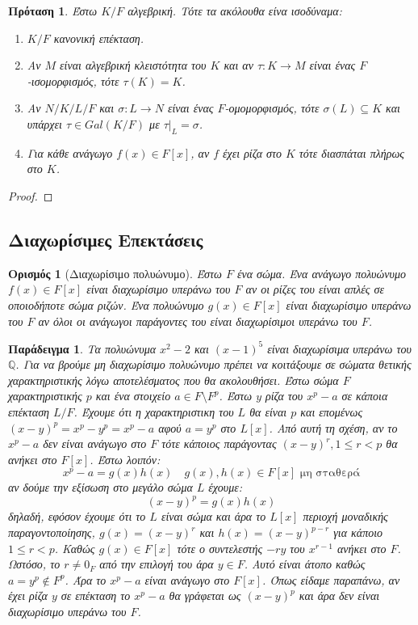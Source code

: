 \documentclass[oneside,a4paper]{article}
\newtheorem{example}{Παράδειγμα}
\newtheorem*{defn}{Ορισμός}
\newtheorem{prop}{Πρόταση}
\newcommand{\Q}{\mathbb{Q}}
\begin{document}
\begin{prop}%
	\label{3.28}
	Έστω $K/F$ αλγεβρική. Τότε τα ακόλουθα είνα ισοδύναμα:
	\begin{enumerate}
		\item $K/F$ κανονική επέκταση.
		\item Αν $M$ είναι αλγεβρική κλειστότητα του $K$ και αν $\tau : K \rightarrow M$ είναι ένας $F$-ισομορφισμός, τότε $\tau(K) = K$. %
		\item Αν $N/K/L/F$ και $\sigma : L \rightarrow N$ είναι ένας $F$-ομομορφισμός, τότε $\sigma(L) \subseteq K$ και υπάρχει $\tau \in Gal(K/F)$ με $\tau|_L = \sigma$.
		\item Για κάθε ανάγωγο $f(x) \in F[x]$, αν $f$ έχει ρίζα στο $K$ τότε διασπάται πλήρως στο $K$.
	\end{enumerate}
\end{prop}

\begin{proof}
\end{proof}

\subsection{Διαχωρίσιμες Επεκτάσεις}
\vspace{1cm}

\begin{defn}[Διαχωρίσιμο πολυώνυμο]
	Έστω $F$ ένα σώμα. Ένα ανάγωγο πολυώνυμο $f(x) \in F[x]$ είναι διαχωρίσιμο υπεράνω του $F$ αν οι ρίζες του είναι απλές σε οποιοδήποτε σώμα ριζών. Ένα πολυώνυμο $g(x) \in F[x]$ είναι διαχωρίσιμο υπεράνω του $F$ αν όλοι οι ανάγωγοι παράγοντες του είναι διαχωρίσιμοι υπεράνω του $F$.
\end{defn}
\begin{example}
	Τα πολυώνυμα $x^2 - 2$ και $(x-1)^5$ είναι διαχωρίσιμα υπεράνω του $\Q$. Για να βρούμε μη διαχωρίσιμο πολυώνυμο πρέπει να κοιτάξουμε σε σώματα θετικής χαρακτηριστικής λόγω αποτελέσματος που θα ακολουθήσει. Έστω σώμα $F$ χαρακτηριστικής $p$ και ένα στοιχείο $a \in F \setminus F^p$. Έστω $y$ ρίζα του $x^p - a$ σε κάποια επέκταση $L/F$. Έχουμε ότι η χαρακτηριστικη του $L$ θα είναι $p$ και επομένως $(x-y)^p = x^p - y^p = x^p - a$ αφού $a = y^p$ στο $L[x]$. Από αυτή τη σχέση, αν το $x^p -a$ δεν είναι ανάγωγο στο $F$ τότε κάποιος παράγοντας $(x-y)^r , 1\leq r < p$ θα ανήκει στο $F[x]$. Έστω λοιπόν:
	$$x^p - a = g(x) h(x) \quad g(x),h(x) \in F[x] \text{ μη σταθερά}$$
	αν δούμε την εξίσωση στο μεγάλο σώμα $L$ έχουμε:
	$$(x-y)^p = g(x)h(x)$$
	δηλαδή, εφόσον έχουμε ότι το $L$ είναι σώμα και άρα το $L[x]$ περιοχή μοναδικής παραγοντοποίησης, $g(x) = (x-y)^r$ και $h(x) = (x-y)^{p-r}$ για κάποιο $1\leq r < p$. Καθώς $g(x) \in F[x]$ τότε ο συντελεστής $-ry$ του $x^{r-1}$ ανήκει στο $F$. Ωστόσο, το $r\neq 0_F$ από την επιλογή του άρα $y \in F$. Αυτό είναι άτοπο καθώς $a = y^p \not\in F^p$. Άρα το $x^p - a$ είναι ανάγωγο στο $F[x]$. Όπως είδαμε παραπάνω, αν έχει ρίζα $y$ σε επέκταση το $x^p -a$ θα γράφεται ως $(x-y)^p$ και άρα δεν είναι διαχωρίσιμο υπεράνω του $F$. 
\end{example}
\end{document}
